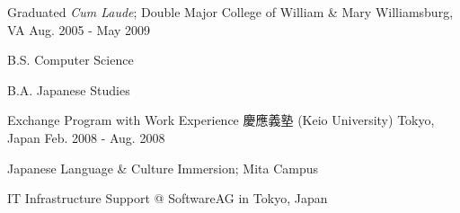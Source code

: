

\begin{cventries}

  \cventry
    {Graduated \emph{Cum Laude}; Double Major} %
    {College of William \& Mary} %
    {Williamsburg, VA} %
    {Aug. 2005 - May 2009} %
    {
      \begin{cvitems} %
        \item {B.S. Computer Science}
        \item {B.A. Japanese Studies}
      \end{cvitems}
    }

  \cventry
    {Exchange Program with Work Experience} %
    {慶應義塾  (Keio University)} %
    {Tokyo, Japan} %
    {Feb. 2008 - Aug. 2008} %
    {
      \begin{cvitems} %
        \item {Japanese Language \& Culture Immersion; Mita Campus}
        \item {IT Infrastructure Support @ SoftwareAG in Tokyo, Japan}
      \end{cvitems}
    }

\end{cventries}
